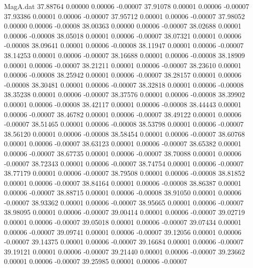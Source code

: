 \begin{filecontents}{MagA.dat}
  37.88764    0.00000    0.00006   -0.00007
  37.91078    0.00001    0.00006   -0.00007
  37.93386    0.00001    0.00006   -0.00007
  37.95712    0.00001    0.00006   -0.00007
  37.98052    0.00000    0.00006   -0.00008
  38.00363    0.00000    0.00006   -0.00007
  38.02688    0.00001    0.00006   -0.00008
  38.05018    0.00001    0.00006   -0.00007
  38.07321    0.00001    0.00006   -0.00008
  38.09641    0.00001    0.00006   -0.00008
  38.11947    0.00001    0.00006   -0.00007
  38.14253    0.00001    0.00006   -0.00007
  38.16688    0.00001    0.00006   -0.00008
  38.18909    0.00001    0.00006   -0.00007
  38.21211    0.00001    0.00006   -0.00007
  38.23610    0.00001    0.00006   -0.00008
  38.25942    0.00001    0.00006   -0.00007
  38.28157    0.00001    0.00006   -0.00008
  38.30481    0.00001    0.00006   -0.00007
  38.32818    0.00001    0.00006   -0.00008
  38.35238    0.00001    0.00006   -0.00007
  38.37576    0.00001    0.00006   -0.00008
  38.39902    0.00001    0.00006   -0.00008
  38.42117    0.00001    0.00006   -0.00008
  38.44443    0.00001    0.00006   -0.00007
  38.46782    0.00001    0.00006   -0.00007
  38.49122    0.00001    0.00006   -0.00007
  38.51465    0.00001    0.00006   -0.00008
  38.53798    0.00001    0.00006   -0.00007
  38.56120    0.00001    0.00006   -0.00008
  38.58454    0.00001    0.00006   -0.00007
  38.60768    0.00001    0.00006   -0.00007
  38.63123    0.00001    0.00006   -0.00007
  38.65382    0.00001    0.00006   -0.00007
  38.67735    0.00001    0.00006   -0.00007
  38.70088    0.00001    0.00006   -0.00007
  38.72343    0.00001    0.00006   -0.00007
  38.74754    0.00001    0.00006   -0.00007
  38.77179    0.00001    0.00006   -0.00007
  38.79508    0.00001    0.00006   -0.00008
  38.81852    0.00001    0.00006   -0.00007
  38.84164    0.00001    0.00006   -0.00008
  38.86387    0.00001    0.00006   -0.00007
  38.88715    0.00001    0.00006   -0.00008
  38.91050    0.00001    0.00006   -0.00007
  38.93362    0.00001    0.00006   -0.00007
  38.95665    0.00001    0.00006   -0.00007
  38.98095    0.00001    0.00006   -0.00007
  39.00414    0.00001    0.00006   -0.00007
  39.02719    0.00001    0.00006   -0.00007
  39.05018    0.00001    0.00006   -0.00007
  39.07434    0.00001    0.00006   -0.00007
  39.09741    0.00001    0.00006   -0.00007
  39.12056    0.00001    0.00006   -0.00007
  39.14375    0.00001    0.00006   -0.00007
  39.16684    0.00001    0.00006   -0.00007
  39.19121    0.00001    0.00006   -0.00007
  39.21440    0.00001    0.00006   -0.00007
  39.23662    0.00001    0.00006   -0.00007
  39.25985    0.00001    0.00006   -0.00007

\end{filecontents}
